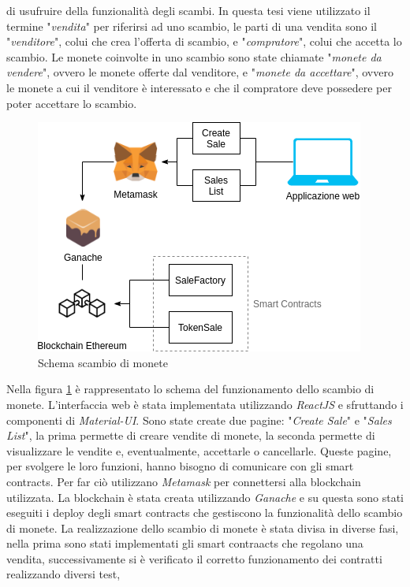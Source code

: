 \documentclass[a4paper]{article}
\begin{document}
        di usufruire della funzionalità degli scambi.
        \newline
        In questa tesi viene utilizzato il termine "\emph{vendita}" per riferirsi ad uno scambio, le parti di una vendita sono il "\emph{venditore}", colui che crea l'offerta di scambio, e "\emph{compratore}", colui che accetta lo scambio.
        Le monete coinvolte in uno scambio sono state chiamate "\emph{monete da vendere}", ovvero le monete offerte dal venditore, e "\emph{monete da accettare}", ovvero le monete a cui il venditore è interessato e che il compratore deve possedere per poter
        accettare lo scambio.
        \begin{figure}[H]
          \includegraphics[scale=0.9, fbox]{structure.png}
          \centering
          \caption{Schema scambio di monete}
          \centering
          \label{fig:structure}
        \end{figure}
        Nella figura \ref{fig:structure} è rappresentato lo schema del funzionamento dello scambio di monete. L'interfaccia web è stata implementata utilizzando \emph{ReactJS} e sfruttando i componenti di \emph{Material-UI}.
        Sono state create due pagine: "\emph{Create Sale}" e "\emph{Sales List}", la prima permette di creare vendite di monete, la seconda permette di visualizzare le vendite e, eventualmente, accettarle o cancellarle.
        Queste pagine, per svolgere le loro funzioni, hanno bisogno di comunicare con gli smart contracts. Per far ciò utilizzano \emph{Metamask} per connettersi alla blockchain utilizzata. La blockchain è stata creata utilizzando \emph{Ganache} e
        su questa sono stati eseguiti i deploy degli smart contracts che gestiscono la funzionalità dello scambio di monete.
        \newline
        La realizzazione dello scambio di monete è stata divisa in diverse fasi, nella prima sono stati implementati gli smart contraacts che regolano una vendita, successivamente si è verificato il corretto funzionamento dei contratti realizzando diversi test,
\end{document}
